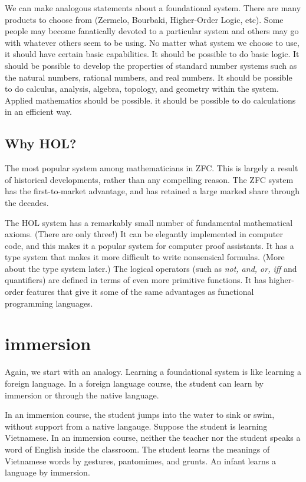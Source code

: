 We can make analogous statements about a foundational system.  There are
many products to choose from (Zermelo, Bourbaki, Higher-Order Logic, etc).  Some people may become fanatically devoted to a particular system and others may go with whatever others seem to be using.  No matter what system we choose to use, it should have certain basic capabilities.  It should be possible to do basic logic.  It should be possible to develop the properties of standard number systems such as the natural numbers, rational numbers, and real numbers.  It should be possible to do calculus, analysis, algebra, topology, and geometry within the system.  Applied mathematics should be possible.  it should be possible to do calculations in an efficient way.

\subsection{Why HOL?}

The most popular system among mathematicians in ZFC.  This is largely a result of historical developments, rather than any compelling reason.  The ZFC system has the first-to-market advantage, and has retained a large marked share through the decades.

The HOL system has a remarkably small number of fundamental mathematical axioms. (There are only three!)  It can be elegantly implemented in computer code, and this makes it a popular system for computer proof assistants.  It has a type system that makes it more difficult to write nonsensical formulas.  (More about the type system later.)  The logical operators (such as {\it not, and, or, iff} and quantifiers) are defined in terms of even more primitive functions.  It has higher-order features  that give it some of the same advantages as functional programming languages.




\section{immersion}

Again, we start with an analogy.  Learning a foundational system is like learning a foreign language.  In a foreign language course, the student can learn by immersion or through the native language.  

In an immersion course, the student jumps into the water to sink or swim, without support from a native langauge.  Suppose the student is learning Vietnamese.  In an immersion course, neither the teacher nor the student speaks a word of English inside the classroom.  The student learns the meanings of Vietnamese words by gestures, pantomimes, and grunts.  An infant learns a language by immersion.  

